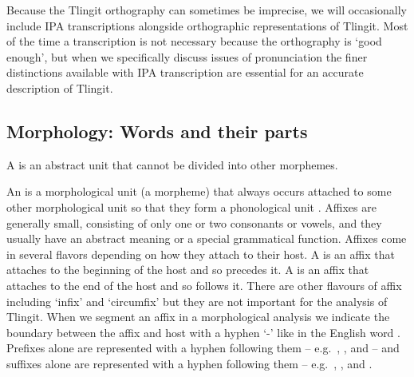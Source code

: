 Because the Tlingit orthography can sometimes be imprecise, we will occasionally include IPA transcriptions alongside orthographic representations of Tlingit. Most of the time a transcription is not necessary because the orthography is ‘good enough’, but when we specifically discuss issues of pronunciation the finer distinctions available with IPA transcription are essential for an accurate description of Tlingit.

\subsection{Morphology: Words and their parts}\label{sec:intro-ling-morph}


A  is an abstract unit that cannot be divided into other morphemes.

An  is a morphological unit (a morpheme) that always occurs attached to some other morphological unit so that they form a phonological unit \parencite[9]{booij:2007}. Affixes are generally small, consisting of only one or two consonants or vowels, and they usually have an abstract meaning or a special grammatical function. Affixes come in several flavors depending on how they attach to their host. A  is an affix that attaches to the beginning of the host and so precedes it. A  is an affix that attaches to the end of the host and so follows it. There are other flavours of affix including ‘infix’ and ‘circumfix’ but they are not important for the analysis of Tlingit. When we segment an affix in a morphological analysis we indicate the boundary between the affix and host with a hyphen ‘-’ like in the English word . Prefixes alone are represented with a hyphen following them – e.g.\ , , and  – and suffixes alone are represented with a hyphen following them – e.g.\ , , and .

